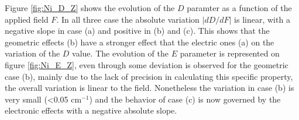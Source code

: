 \documentclass[10pt]{report}
\numberwithin{equation}{section}
\begin{document}

Figure \ref{fig:Ni_D_Z} shows the evolution of the $D$ paramter as a function of the applied field $F$.
In all three case the absolute variation $|dD/dF|$ is linear, with a negative slope in case (a) and positive in (b) and (c).
This shows that the geometric effects (b) have a stronger effect that the electric ones (a) on the variation of the $D$ value.
The evolution of the $E$ parameter is represented on figure \ref{fig:Ni_E_Z}, even through some deviation is observed for the geometric case (b), mainly due to the lack of precision in calculating this specific property, the overall variation is linear to the field.
Nonetheless the variation in case (b) is very small (<0.05 cm$^{-1}$) and the behavior of case (c) is now governed by the electronic effects with a negative absolute slope.
\end{document}
